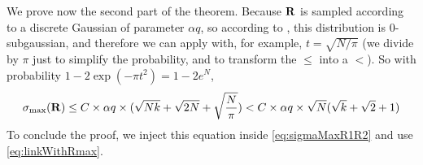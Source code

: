 {\begin{proofE}
    We prove now the second part of the theorem. Because $\mathbf{R}$ is sampled according to a discrete Gaussian of parameter $\alpha q$, so according to \cite[Lem.~2.8]{MP11}, this distribution is $0$-subgaussian, and therefore we can apply \cite[Lem.~2.9]{MP11} with, for example, $t=\sqrt{N/\pi}$ (we divide by $\pi$ just to simplify the probability, and to transform the $\leq$ into a $<$). So with probability $1-2\exp(-\pi t^2) = 1-2e^N$,
    \begin{align*}
      \sigma_{\max}(\mathbf{R}) \leq C \times \alpha q \times (\sqrt{Nk}+\sqrt{2N}+\sqrt{\frac{N}{\pi}}) < C \times \alpha q \times \sqrt{N}(\sqrt{k}+\sqrt{2}+1)
    \end{align*}
    To conclude the proof, we inject this equation inside \cref{eq:sigmaMaxR1R2} and use \cref{eq:linkWithRmax}.
  \end{proofE}
}

